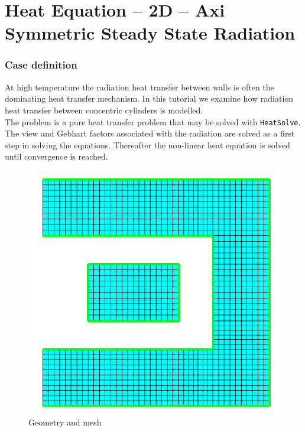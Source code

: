 \chapter{Heat Equation -- 2D -- Axi Symmetric Steady State Radiation}



\subsection*{Case definition}

At high temperature the radiation heat transfer between walls 
is often the dominating heat transfer mechanism. In this
tutorial we examine how radiation heat transfer between 
concentric cylinders is modelled.\\

The problem is a pure heat transfer problem that may be solved
with \texttt{HeatSolve}. The view and Gebhart factors 
associated with the radiation are solved as a first step 
in solving the equations. Thereafter the non-linear heat equation 
is solved until convergence is reached.


\begin{figure}
\begin{center}
\includegraphics[width=100 mm]{geometry}
\caption{Geometry and mesh}\label{fg:geometry}
\end{center}
\end{figure}  


